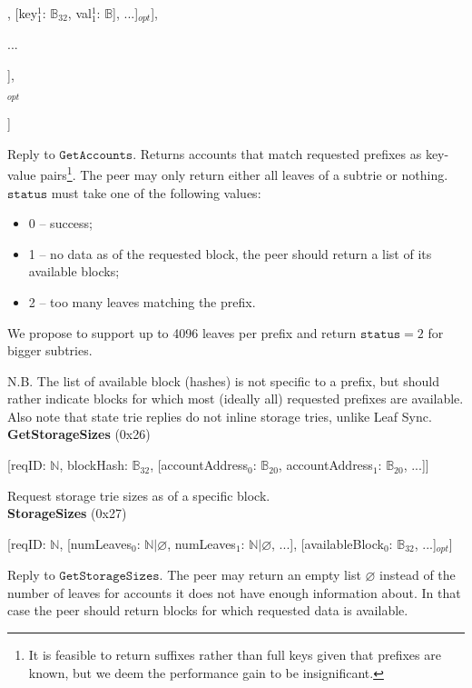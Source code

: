 \documentclass{amsart}
\begin{document}
\qquad [status$_1$: $\mathbb{N}$, [[key$^0_{1}$: $\mathbb{B}_{32}$, val$^0_{1}$: $\mathbb{B}$], [key$^1_{1}$: $\mathbb{B}_{32}$, val$^1_{1}$: $\mathbb{B}$], ...]$_{opt}$],

\qquad ...

\quad ],

$_{opt}$

]
\medskip

Reply to $\texttt{GetAccounts}$.
Returns accounts that match requested prefixes as key-value pairs\footnote{It
is feasible to return suffixes rather than full keys given that prefixes are known,
but we deem the performance gain to be insignificant.}.
The peer may only return either all leaves of a subtrie or nothing.
$\texttt{status}$ must take one of the following values:
\begin{itemize}
\item 0 -- success;
\item 1 -- no data as of the requested block, the peer should return a list of its available blocks;
\item 2 -- too many leaves matching the prefix.
\end{itemize}
We propose to support up to 4096 leaves per prefix
and return $\texttt{status} = 2$ for bigger subtries.

N.B. The list of available block (hashes) is not specific to a prefix,
but should rather indicate blocks for which most (ideally all) requested prefixes are available.
Also note that state trie replies do not inline storage tries, unlike Leaf Sync.\\

\textbf{GetStorageSizes} (0x26)

[reqID: $\mathbb{N}$, blockHash: $\mathbb{B}_{32}$,
[accountAddress$_0$: $\mathbb{B}_{20}$, accountAddress$_1$: $\mathbb{B}_{20}$, ...]]
\medskip

Request storage trie sizes as of a specific block.\\

\textbf{StorageSizes} (0x27)

[reqID: $\mathbb{N}$,
[numLeaves$_0$: $\mathbb{N} | \varnothing$, numLeaves$_1$: $\mathbb{N} | \varnothing$, ...],
[availableBlock$_0$: $\mathbb{B}_{32}$, ...]$_{opt}$]
\medskip

Reply to $\texttt{GetStorageSizes}$.
The peer may return an empty list $\varnothing$ instead of the number of leaves for accounts it does not have enough information about.
In that case the peer should return blocks for which requested data is available.\\
\end{document}
